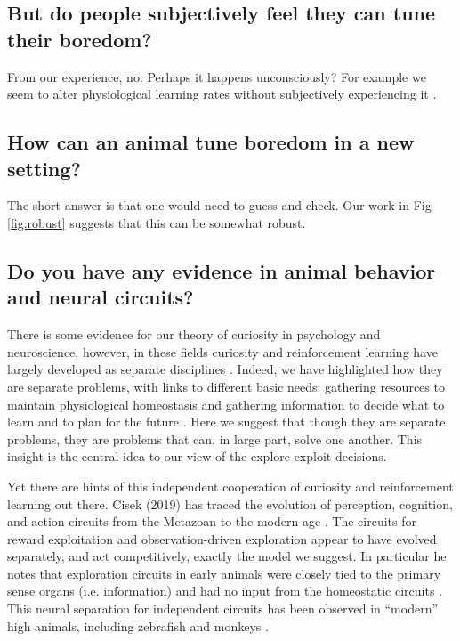 \subsection*{But do people subjectively feel they can tune their boredom?}
From our experience, no. Perhaps it happens unconsciously? For example we seem to alter physiological learning rates without subjectively experiencing it \citep{Behrens2007}.


\subsection*{How can an animal tune boredom in a new setting?}
The short answer is that one would need to guess and check. Our work in Fig \ref{fig:robust} suggests that this can be somewhat robust.


\subsection*{Do you have any evidence in animal behavior and neural circuits?}
There is some evidence for our theory of curiosity in psychology and neuroscience, however, in these fields curiosity and reinforcement learning have largely developed as separate disciplines \citep{Berlyne1950,Kidd2015,Sutton2018}. Indeed, we have highlighted how they are separate problems, with links to different basic needs: gathering resources to maintain physiological homeostasis \citep{Keramati2014,Juechems2019} and gathering information to decide what to learn and to plan for the future \citep{Valiant1984,Sutton2018}. Here we suggest that though they are separate problems, they are problems that can, in large part, solve one another. This insight is the central idea to our view of the explore-exploit decisions. 

Yet there are hints of this independent cooperation of curiosity and reinforcement learning out there. Cisek (2019) has traced the evolution of perception, cognition, and action circuits from the Metazoan to the modern age \citep{Cisek2019}. The circuits for reward exploitation and observation-driven exploration appear to have evolved separately, and act competitively, exactly the model we suggest. In particular he notes that exploration circuits in early animals were closely tied to the primary sense organs (i.e. information) and had no input from the homeostatic circuits \citep{Keramati2014,Cisek2019,Juechems2019}. This neural separation for independent circuits has been observed in ``modern'' high animals, including zebrafish \citep{Marques2019} and monkeys \citep{White2019,Wang2019}. 


